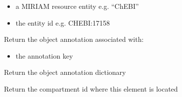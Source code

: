 \documentclass[letterpaper,10pt,english]{sphinxmanual}
\begin{document}
\begin{fulllineitems}
\begin{fulllineitems}
\begin{itemize}
\item {} 
\sphinxAtStartPar
{} a MIRIAM resource entity e.g. “ChEBI”

\item {} 
\sphinxAtStartPar
{} the entity id e.g. CHEBI:17158

\end{itemize}

\end{fulllineitems}


\begin{fulllineitems}
\label{\detokenize{modules_doc:cbmpy.CBModel.Fbase.getAnnotation}}
\pysigstartsignatures
{}
\pysigstopsignatures
\sphinxAtStartPar
Return the object annotation associated with:
\begin{itemize}
\item {} 
\sphinxAtStartPar
{} the annotation key

\end{itemize}

\end{fulllineitems}


\begin{fulllineitems}
\label{\detokenize{modules_doc:cbmpy.CBModel.Fbase.getAnnotations}}
\pysigstartsignatures
{}
\pysigstopsignatures
\sphinxAtStartPar
Return the object annotation dictionary

\end{fulllineitems}


\begin{fulllineitems}
\label{\detokenize{modules_doc:cbmpy.CBModel.Fbase.getCompartmentId}}
\pysigstartsignatures
{}
\pysigstopsignatures
\sphinxAtStartPar
Return the compartment id where this element is located

\end{fulllineitems}


\end{fulllineitems}
\end{document}
